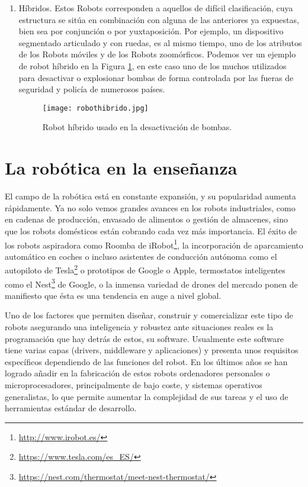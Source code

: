 \begin{enumerate}[1.]
	\item Híbridos.	Estos Robots corresponden a aquellos de difícil clasificación, cuya estructura se sitúa en combinación con alguna de las anteriores ya expuestas, bien sea por conjunción o por yuxtaposición. Por ejemplo, un dispositivo segmentado articulado y con ruedas, es al mismo tiempo, uno de los atributos de los Robots móviles y de los Robots zoomórficos. Podemos ver un ejemplo de robot híbrido en la Figura \ref{fig:hibrido}, en este caso uno de los muchos utilizados para desactivar o explosionar bombas de forma controlada por las fueras de seguridad y policía de numerosos países.
	\begin{figure}[h]
		\centering\texttt{[image: robothibrido.jpg]}
		\caption{Robot híbrido usado en la desactivación de bombas.}
		\label{fig:hibrido}
	\end{figure}
\end{enumerate}


\section{La robótica en la enseñanza}
\label{sec:intr_roboticaensenanza}

El campo de la robótica está en constante expansión, y su popularidad aumenta rápidamente. Ya no solo vemos grandes avances en los robots industriales, como en cadenas de producción, envasado de alimentos o gestión de almacenes, sino que los robots domésticos están cobrando cada vez más importancia. El éxito de los robots aspiradora como Roomba de iRobot\footnote{\url{http://www.irobot.es/}}, la incorporación de aparcamiento automático en coches o incluso asistentes de conducción autónoma como el autopiloto de Tesla\footnote{\url{https://www.tesla.com/es_ES/}} o prototipos de Google o Apple, termostatos inteligentes como el Nest\footnote{\url{https://nest.com/thermostat/meet-nest-thermostat/}} de Google, o la inmensa variedad de drones del mercado ponen de manifiesto que ésta es una tendencia en auge a nivel global.

Uno de los factores que permiten diseñar, construir y comercializar este tipo de robots asegurando una inteligencia y robustez ante situaciones reales es la programación que hay detrás de estos, su software. Usualmente este software tiene varias capas (drivers, middleware y aplicaciones) y presenta unos requisitos específicos dependiendo de las funciones del robot. En los últimos años se han logrado añadir en la fabricación de estos robots ordenadores personales o microprocesadores, principalmente de bajo coste, y sistemas operativos generalistas, lo que permite aumentar la complejidad de sus tareas y el uso de herramientas estándar de desarrollo.


